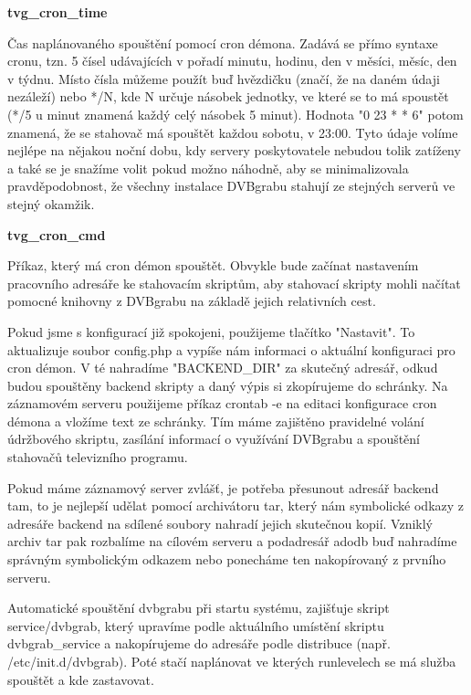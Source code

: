 \textbf{tvg\_cron\_time}

Čas naplánovaného spouštění pomocí cron démona. Zadává se přímo syntaxe cronu, tzn. 5 čísel udávajících v pořadí minutu, hodinu, den v měsíci, měsíc, den v týdnu. Místo čísla můžeme použít buď hvězdičku (značí, že na daném údaji nezáleží) nebo */N, kde N určuje násobek jednotky, ve které se to má spoustět (*/5 u minut znamená každý celý násobek 5 minut). Hodnota "0 23 * * 6" potom znamená, že se stahovač má spouštět každou sobotu, v 23:00. Tyto údaje volíme nejlépe na nějakou noční dobu, kdy servery poskytovatele nebudou tolik zatíženy a také se je snažíme volit pokud možno náhodně, aby se minimalizovala pravděpodobnost, že všechny instalace DVBgrabu stahují ze stejných serverů ve stejný okamžik.

\vspace{10pt}

\textbf{tvg\_cron\_cmd}

Příkaz, který má cron démon spouštět. Obvykle bude začínat nastavením pracovního adresáře ke stahovacím skriptům, aby stahovací skripty mohli načítat pomocné knihovny z DVBgrabu na základě jejich relativních cest.

\vspace{10pt}

Pokud jsme s konfigurací již spokojeni, použijeme tlačítko "Nastavit". To aktualizuje soubor config.php a vypíše nám informaci o aktuální konfiguraci pro cron démon. V té nahradíme "BACKEND\_DIR" za skutečný adresář, odkud budou spouštěny backend skripty a daný výpis si zkopírujeme do schránky. Na záznamovém serveru použijeme příkaz crontab -e na editaci konfigurace cron démona a vložíme text ze schránky. Tím máme zajištěno pravidelné volání údržbového skriptu, zasílání informací o využívání DVBgrabu a spouštění stahovačů televizního programu.

\vspace{10pt}

Pokud máme záznamový server zvlášť, je potřeba přesunout adresář backend tam, to je nejlepší udělat pomocí archivátoru tar, který nám symbolické odkazy z adresáře backend na sdílené soubory nahradí jejich skutečnou kopií. Vzniklý archiv tar pak rozbalíme na cílovém serveru a podadresář adodb buď nahradíme správným symbolickým odkazem nebo ponecháme ten nakopírovaný z prvního serveru.

Automatické spouštění dvbgrabu při startu systému, zajišťuje skript service/dvbgrab, který upravíme podle aktuálního umístění skriptu dvbgrab\_service a nakopírujeme do adresáře podle distribuce (např. /etc/init.d/dvbgrab). Poté stačí naplánovat ve kterých runlevelech se má služba spouštět a kde zastavovat.


